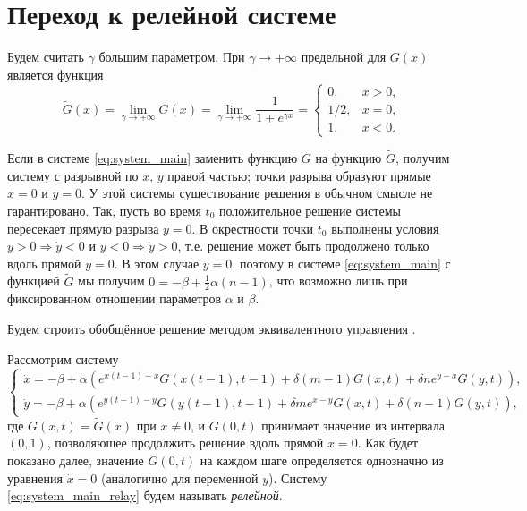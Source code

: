 \section{Переход к релейной системе}\label{sec:ch3/sect3}

Будем считать $\gamma$ большим параметром. При $\gamma \to +\infty$ предельной для $G(x)$ является функция 
%
\begin{equation}
	\label{eq:relay_G_tilde}
	\tilde{G}(x) = \lim\limits_{\gamma \to +\infty}G(x) = \lim\limits_{\gamma \to +\infty} \dfrac{1}{1 + e^{\gamma x}} = 
	\begin{cases}
		0, & x > 0,\\
		1/2, & x = 0,\\
		1, & x < 0.
	\end{cases}
\end{equation}

Если в системе \eqref{eq:system_main} заменить функцию $G$ на функцию $\tilde{G}$, получим систему с разрывной по $x$, $y$ правой частью; точки разрыва образуют прямые $x = 0$ и $y = 0$. У этой системы существование решения в обычном смысле не гарантировано. Так, пусть во время $t_0$ положительное решение системы пересекает прямую разрыва $y = 0$. В окрестности точки $t_0$ выполнены условия $y > 0 \Rightarrow \dot{y} < 0$ и $y < 0 \Rightarrow \dot{y} > 0$, т.е. решение может быть продолжено только вдоль прямой $y = 0$. В этом случае $\dot{y} = 0$, поэтому в системе \eqref{eq:system_main} с функцией $\tilde{G}$ мы получим $0 = -\beta + \frac{1}{2} \alpha (n - 1)$, что возможно лишь при фиксированном отношении параметров $\alpha$ и $\beta$.

Будем строить обобщённое решение методом эквивалентного управления \cite[\S 4, с. 54]{Filippov1988}.

Рассмотрим систему
%
\small
\begin{equation}
	\label{eq:system_main_relay}
	\begin{cases}
		\dot{x} = -\beta + \alpha \left(e^{x(t - 1) - x} G(x(t - 1), t - 1) + \delta (m - 1) G(x, t) + \delta n e^{y - x} G(y, t)\right),\\
		\dot{y} = -\beta + \alpha \left(e^{y(t - 1) - y} G(y(t - 1), t - 1) + \delta m e^{x - y} G(x, t) + \delta (n - 1) G(y, t)\right),
	\end{cases}
\end{equation}
\normalsize
%
где $G(x, t) = \tilde{G}(x)$ при $x \neq 0$, и $G(0, t)$ принимает значение из интервала $(0, 1)$, позволяющее продолжить решение вдоль прямой $x = 0$. Как будет показано далее, значение $G(0, t)$ на каждом шаге определяется однозначно из уравнения $\dot{x} = 0$ (аналогично для переменной $y$).
%
Систему \eqref{eq:system_main_relay} будем называть \emph{релейной}.

